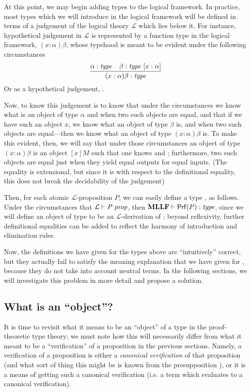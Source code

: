 \documentclass[main.tex]{subfiles}
\begin{document}
At this point, we may begin adding types to the logical framework. In practice,
most types which we will introduce in the logical framework will be defined in
terms of a judgement of the logical theory $\mathcal{L}$ which lies below it.
For instance, hypothetical judgement in $\mathcal{L}$ is represented by a
function type in the logical framework, $(x:\alpha)\beta$, whose typehood is
meant to be evident under the following circumstances
\[
  \infer{
    \type{(x:\alpha)\beta}
  }{
    \type\alpha &
    \lfhyp{\type\beta}{x:\alpha}
  }
\]
Or as a hypothetical judgement,
.

Now, to know this judgement is to know that under the circumstances we know
what is an object of type $\alpha$ and when two such objects are equal, and
that if we have such an object $x$, we know what an object of type $\beta$ is,
and when two such objects are equal---then we know what an object of type
$(x:\alpha)\beta$ is. To make this evident, then, we will say that under those
circumstances an object of type $(x:\alpha)\beta$ is an object $[x]M$ such that
one knows  and ;
furthermore, two such objects are equal just when they yield equal outputs for
equal inputs. (The equality is extensional, but since it is with respect to the
definitional equality, this does not break the decidability of the judgement)

Then, for each atomic $\mathcal{L}$-proposition $P$, we can easily define a
type , as follows. Under the circumstances that
$\mathcal{L}\vdash P\;\mathit{prop}$, then $\textbf{MLLF}\vdash\mathsf{Prf}(P):\mathit{type}$, since we will
define an object of type  to be an $\mathcal{L}$-derivation of
; beyond reflexivity, further definitional equalities can be added to
reflect the harmony of introduction and elimination rules.

Now, the definitions we have given for the types above are ``intuitively''
correct, but they actually fail to satisfy the meaning explanation that we have
given for \type\alpha, because they do not take into account neutral terms. In
the following sections, we will investigate this problem in more detail and
propose a solution.

\subsection{What is an ``object''?}
It is time to revisit what it means to be an ``object'' of a type in the
proof-theoretic type theory; we must note how this will necessarily differ from
what it meant to be a ``verification'' of a proposition in the previous
sections. Namely, a verification of a proposition is either a \emph{canonical
verification} of that proposition (and what sort of thing this might be is
known from the presupposition ), or it is a means of getting such
a canonical verification (i.e. a term which evaluates to a canonical
verification).
\end{document}
